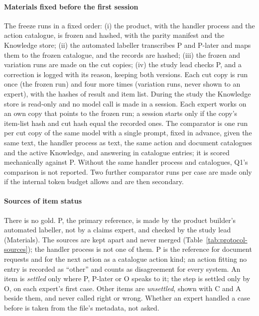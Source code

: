 \paragraph{Materials fixed before the first session}
The freeze runs in a fixed order: (i) the product, with the handler process and the action catalogue, is frozen and hashed, with the parity manifest and the Knowledge store; (ii) the automated labeller transcribes P and P-later and maps them to the frozen catalogue, and the records are hashed; (iii) the frozen and variation runs are made on the cut copies; (iv) the study lead checks P, and a correction is logged with its reason, keeping both versions. Each cut copy is run once (the frozen run) and four more times (variation runs, never shown to an expert), with the hashes of result and item list. During the study the Knowledge store is read-only and no model call is made in a session. Each expert works on an own copy that points to the frozen run; a session starts only if the copy's item-list hash and cut hash equal the recorded ones. The comparator is one run per cut copy of the same model with a single prompt, fixed in advance, given the same text, the handler process as text, the same action and document catalogues and the active Knowledge, and answering in catalogue entries; it is scored mechanically against P. Without the same handler process and catalogues, Q1's comparison is not reported. Two further comparator runs per case are made only if the internal token budget allows and are then secondary.

\paragraph{Sources of item status}
There is no gold. P, the primary reference, is made by the product builder's automated labeller, not by a claims expert, and checked by the study lead (Materials). The sources are kept apart and never merged (Table~\ref{tab:protocol-sources}); the handler process is not one of them. P is the reference for document requests and for the next action as a catalogue action kind; an action fitting no entry is recorded as ``other'' and counts as disagreement for every system. An item is \emph{settled} only where P, P-later or O speaks to it; the step is settled only by O, on each expert's first case. Other items are \emph{unsettled}, shown with C and A beside them, and never called right or wrong. Whether an expert handled a case before is taken from the file's metadata, not asked.


